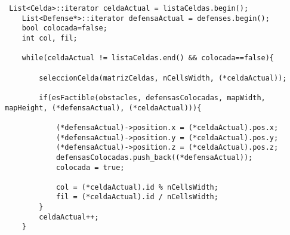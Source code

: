 \begin{lstlisting}
 List<Celda>::iterator celdaActual = listaCeldas.begin();
	List<Defense*>::iterator defensaActual = defenses.begin();
	bool colocada=false;
	int col, fil;
	
	while(celdaActual != listaCeldas.end() && colocada==false){

		seleccionCelda(matrizCeldas, nCellsWidth, (*celdaActual));	

		if(esFactible(obstacles, defensasColocadas, mapWidth, mapHeight, (*defensaActual), (*celdaActual))){

			(*defensaActual)->position.x = (*celdaActual).pos.x;
			(*defensaActual)->position.y = (*celdaActual).pos.y;
			(*defensaActual)->position.z = (*celdaActual).pos.z;
		    defensasColocadas.push_back((*defensaActual));
		    colocada = true;	
    		
    		col = (*celdaActual).id % nCellsWidth;	
    		fil = (*celdaActual).id / nCellsWidth;	
    	}
    	celdaActual++;
    }
\end{lstlisting}